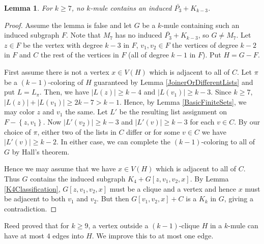 \documentclass[12pt]{article}
\theoremstyle{plain}
\newtheorem{lem}[thm]{Lemma}
\theoremstyle{definition}
\theoremstyle{remark}
\newcommand{\set}[1]{\left\{ #1 \right\}}
\newcommand{\card}[1]{\left|#1\right|}
\begin{document}
\begin{lem}\label{NoTwooks}
For $k \geq 7$, no $k$-mule contains an induced $\bar{P_3} + K_{k - 3}$.
\end{lem}
\begin{proof}
Assume the lemma is false and let $G$ be a $k$-mule containing such an induced subgraph $F$.  Note that $M_7$ has no induced $\bar{P_3} + K_{k - 3}$, so $G \neq M_7$. Let $z \in F$ be the vertex with degree $k-3$ in $F$, $v_1, v_2 \in F$ the vertices of degree $k-2$ in $F$ and $C$ the rest of the 
vertices in $F$ (all of degree $k-1$ in $F$). Put $H = G - F$.\newline

First assume there is not a vertex $x \in V(H)$ which is adjacent to all of $C$. Let $\pi$ be a $(k-1)$-coloring of $H$ guaranteed by Lemma \ref{JoinerOrDifferentLists} and put $L = L_\pi$.  Then, we have $\card{L(z)} \geq k-4$ and $\card{L(v_1)} \geq k-3$.  Since $k \geq 7$, $\card{L(z)} + \card{L(v_1)} \geq 2k - 7 > k - 1$.  Hence, by Lemma \ref{BasicFiniteSets}, we may color $z$ and $v_1$ the same.  Let $L'$ be the resulting list assignment on $F - \set{z, v_1}$. Now $\card{L'(v_2)} \geq k-3$ and $\card{L'(v)} \geq k-3$ for each $v \in C$.  By our choice of $\pi$, either two of the lists in $C$ differ or for some $v \in C$ we have $\card{L'(v)} \geq k-2$.  In either case, we can complete the $(k-1)$-coloring to all of $G$ by Hall's theorem.\newline   

Hence we may assume that we have $x \in V(H)$ which is adjacent to all of $C$.
Thus $G$ contains the induced subgraph $K_4 + G[z, v_1, v_2, x]$.  By Lemma \ref{K4Classification}, $G[z, v_1, v_2, x]$ must be a clique and a vertex and hence $x$ must be adjacent to both $v_1$ and $v_2$.  But then $G[v_1, v_2, x] + C$ is a $K_k$ in $G$, giving a contradiction.
\end{proof}

Reed proved that for $k \geq 9$, a vertex outside a $(k - 1)$-clique $H$ in a $k$-mule can have at most $4$ edges into $H$.  We improve this to at most one edge.
\end{document}

